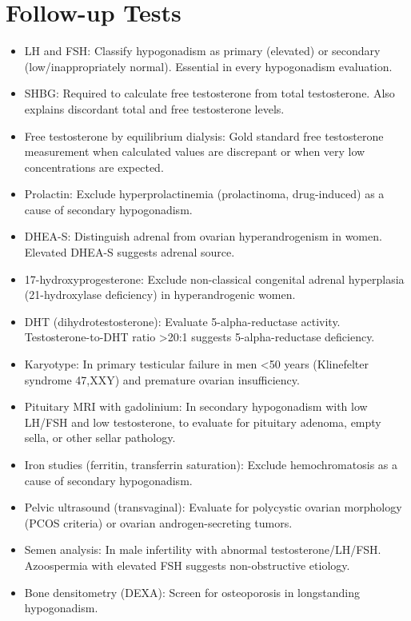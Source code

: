 \section*{Follow-up Tests}
\begin{itemize}
  \item LH and FSH: Classify hypogonadism as primary (elevated) or secondary (low/inappropriately normal). Essential in every hypogonadism evaluation.
  \item SHBG: Required to calculate free testosterone from total testosterone. Also explains discordant total and free testosterone levels.
  \item Free testosterone by equilibrium dialysis: Gold standard free testosterone measurement when calculated values are discrepant or when very low concentrations are expected.
  \item Prolactin: Exclude hyperprolactinemia (prolactinoma, drug-induced) as a cause of secondary hypogonadism.
  \item DHEA-S: Distinguish adrenal from ovarian hyperandrogenism in women. Elevated DHEA-S suggests adrenal source.
  \item 17-hydroxyprogesterone: Exclude non-classical congenital adrenal hyperplasia (21-hydroxylase deficiency) in hyperandrogenic women.
  \item DHT (dihydrotestosterone): Evaluate 5-alpha-reductase activity. Testosterone-to-DHT ratio >20:1 suggests 5-alpha-reductase deficiency.
  \item Karyotype: In primary testicular failure in men <50 years (Klinefelter syndrome 47,XXY) and premature ovarian insufficiency.
  \item Pituitary MRI with gadolinium: In secondary hypogonadism with low LH/FSH and low testosterone, to evaluate for pituitary adenoma, empty sella, or other sellar pathology.
  \item Iron studies (ferritin, transferrin saturation): Exclude hemochromatosis as a cause of secondary hypogonadism.
  \item Pelvic ultrasound (transvaginal): Evaluate for polycystic ovarian morphology (PCOS criteria) or ovarian androgen-secreting tumors.
  \item Semen analysis: In male infertility with abnormal testosterone/LH/FSH. Azoospermia with elevated FSH suggests non-obstructive etiology.
  \item Bone densitometry (DEXA): Screen for osteoporosis in longstanding hypogonadism.
\end{itemize}

